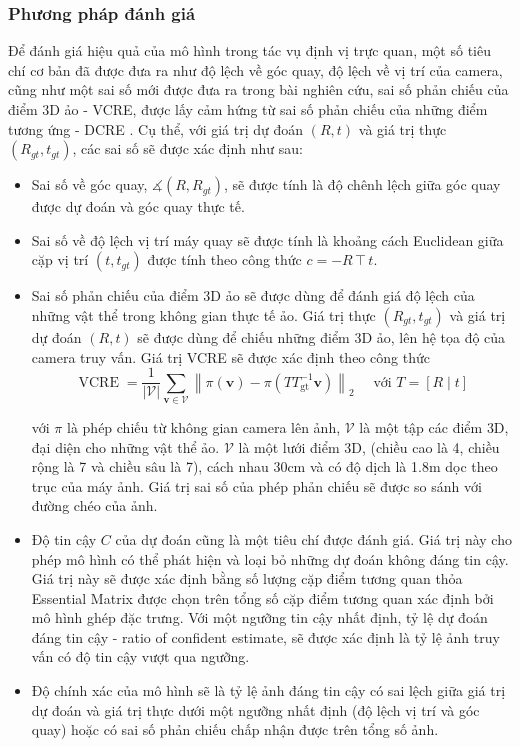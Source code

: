\subsubsection{Phương pháp đánh giá}
Để đánh giá hiệu quả của mô hình trong tác vụ định vị trực quan, một số tiêu chí cơ bản đã được đưa ra như độ lệch về góc quay, độ lệch về vị trí của camera, cũng như một sai số mới được đưa ra trong bài nghiên cứu, sai số phản chiếu của điểm 3D ảo - VCRE, được lấy cảm hứng từ sai số phản chiếu của những điểm tương ứng - DCRE \cite{wald2020beyond}. Cụ thể, với giá trị dự đoán $(R,t)$ và giá trị thực $(R_{gt},t_{gt})$, các sai số sẽ được xác định như sau:
\begin{itemize}
  \item Sai số về góc quay, $\measuredangle(R,R_{gt})$, sẽ được tính là độ chênh lệch giữa góc quay được dự đoán và góc quay thực tế.
  \item Sai số về độ lệch vị trí máy quay sẽ được tính là khoảng cách Euclidean giữa cặp vị trí $(t,t_{gt})$ được tính theo công thức $c=-R \intercal t$.
  \item Sai số phản chiếu của điểm 3D ảo sẽ được dùng để đánh giá độ lệch của những vật thể trong không gian thực tế ảo. Giá trị thực $(R_{gt},t_{gt})$ và giá trị dự đoán $(R,t)$ sẽ được dùng để chiếu những điểm 3D ảo, lên hệ tọa độ của camera truy vấn. Giá trị VCRE sẽ được xác định theo công thức
        \begin{equation}
          \operatorname{VCRE}=\frac{1}{|\mathcal{V}|} \sum_{\mathbf{v} \in \mathcal{V}}\left\|\pi(\mathbf{v})-\pi\left(T T_{\mathrm{gt}}^{-1} \mathbf{v}\right)\right\|_2 \quad \text { với } T=[R \mid t]
        \end{equation}

        với $\pi$ là phép chiếu từ không gian camera lên ảnh, $\mathcal{V}$ là một tập các điểm 3D, đại diện cho những vật thể ảo. $\mathcal{V}$ là một lưới điểm 3D, (chiều cao là 4, chiều rộng là 7 và chiều sâu là 7), cách nhau 30cm và có độ dịch là 1.8m dọc theo trục của máy ảnh. Giá trị sai số của phép phản chiếu sẽ được so sánh với đường chéo của ảnh.
  \item Độ tin cậy $C$ của dự đoán cũng là một tiêu chí được đánh giá. Giá trị này cho phép mô hình có thể phát hiện và loại bỏ những dự đoán không đáng tin cậy. Giá trị này sẽ được xác định bằng số lượng cặp điểm tương quan thỏa Essential Matrix được chọn trên tổng số cặp điểm tương quan xác định bởi mô hình ghép đặc trưng. Với một ngưỡng tin cậy nhất định, tỷ lệ dự đoán đáng tin cậy - ratio of confident estimate, sẽ được xác định là tỷ lệ ảnh truy vấn có độ tin cậy vượt qua ngưỡng.
  \item Độ chính xác của mô hình sẽ là tỷ lệ ảnh đáng tin cậy có sai lệch giữa giá trị dự đoán và giá trị thực dưới một ngưỡng nhất định (độ lệch vị trí và góc quay) hoặc có sai số phản chiếu chấp nhận được trên tổng số ảnh.
\end{itemize}

